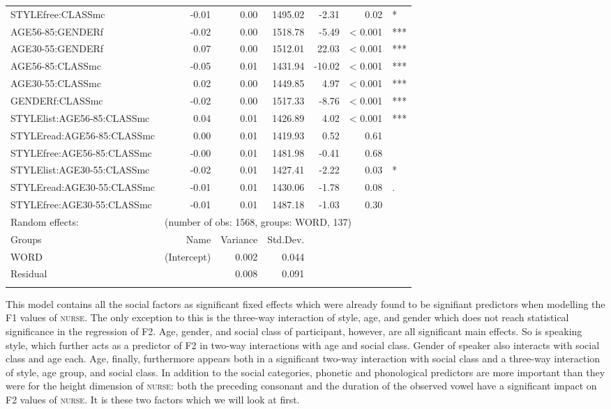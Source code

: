 {\begin{longtable}[c]{p{}rrrrrl}
		STYLEfree:CLASSmc & -0.01 & 0.00 & 1495.02 & -2.31 & 0.02 & *\\ 
		AGE56-85:GENDERf & -0.02 & 0.00 & 1518.78 & -5.49 & < 0.001 & *** \\ 
		AGE30-55:GENDERf & 0.07 & 0.00 & 1512.01 & 22.03 & < 0.001 & *** \\ 
		AGE56-85:CLASSmc & -0.05 & 0.01 & 1431.94 & -10.02 & < 0.001 & *** \\ 
		AGE30-55:CLASSmc & 0.02 & 0.00 & 1449.85 & 4.97 & < 0.001 & *** \\ 
		GENDERf:CLASSmc & -0.02 & 0.00 & 1517.33 & -8.76 & < 0.001 & *** \\ 
		STYLElist:AGE56-85:CLASSmc & 0.04 & 0.01 & 1426.89 & 4.02 & < 0.001 & *** \\ 
		STYLEread:AGE56-85:CLASSmc & 0.00 & 0.01 & 1419.93 & 0.52 & 0.61 & \\ 
		STYLEfree:AGE56-85:CLASSmc & -0.00 & 0.01 & 1481.98 & -0.41 & 0.68 & \\ 
		STYLElist:AGE30-55:CLASSmc & -0.02 & 0.01 & 1427.41 & -2.22 & 0.03 & * \\ 
		STYLEread:AGE30-55:CLASSmc & -0.01 & 0.01 & 1430.06 & -1.78 & 0.08 & .\\ 
		STYLEfree:AGE30-55:CLASSmc & -0.01 & 0.01 & 1487.18 & -1.03 & 0.30 & \\ 
		\midrule
		Random effects: & \multicolumn{6}{l}{(number of obs: 1568, groups: WORD, 137)} \\
		Groups &         Name & Variance &      Std.Dev. & & & \\
		WORD &  (Intercept) & 0.002 & 0.044 & & & \\
		Residual  &         & 0.008 & 0.091 & & & \\
		\lspbottomrule
	\end{longtable}
	
}


This model contains all the social factors as significant fixed effects which were already found to be signifiant predictors when modelling the F1 values of \textsc{nurse}.
The only exception to this is the three-way interaction of style, age, and gender which does not reach statistical significance in the regression of F2.
Age, gender, and social class of participant, however, are all significant main effects.
So is speaking style, which further acts as a predictor of F2 in two-way interactions with age and social class.
Gender of speaker also interacts with social class and age each.
Age, finally, furthermore appears both in a significant two-way interaction with social class and a three-way interaction of style, age group, and social class.
In addition to the social categories, phonetic and phonological predictors are more important than they were for the height dimension of \textsc{nurse}: both the preceding consonant and the duration of the observed vowel have a significant impact on F2 values of \textsc{nurse}.
It is these two factors which we will look at first.


